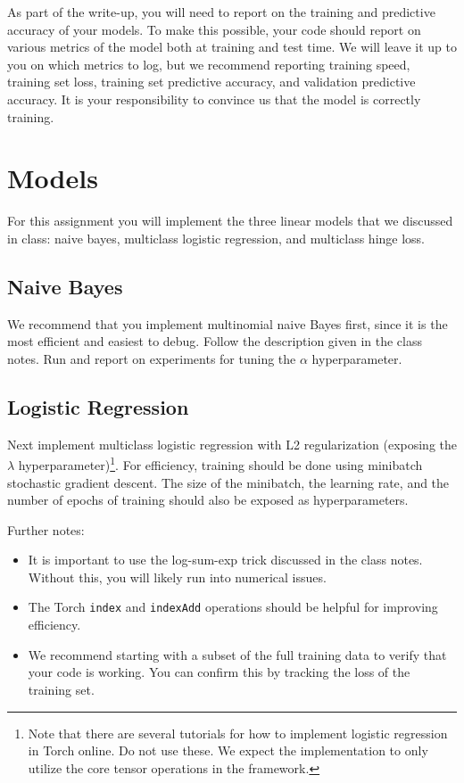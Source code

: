 \documentclass[11pt]{article}
\begin{document}
As part of the write-up, you will need to report on the training and
predictive accuracy of your models. To make this possible, your code
should report on various metrics of the model both at training and
test time. We will leave it up to you on which metrics to log, but we
recommend reporting training speed, training set loss, training set
predictive accuracy, and validation predictive accuracy. It is your
responsibility to convince us that the model is correctly training.

\section{Models}

For this assignment you will implement the three linear models that 
we discussed in class: naive bayes, multiclass logistic regression, 
and multiclass hinge loss.

\subsection{Naive Bayes}

We recommend that you implement multinomial naive Bayes first, since
it is the most efficient and easiest to debug. Follow the description
given in the class notes. Run and report on experiments for tuning the
$\alpha$ hyperparameter.

\subsection{Logistic Regression}

Next implement multiclass logistic regression with L2 regularization
(exposing the $\lambda$ hyperparameter)\footnote{Note that there are several tutorials for how to implement logistic
regression in Torch online. Do not use these. We expect the
implementation to only utilize the core tensor operations in the
framework.}. For efficiency, training
should be done using minibatch stochastic gradient descent. The size
of the minibatch, the learning rate, and the number of epochs of
training should also be exposed as hyperparameters.


Further notes:

\begin{itemize}
\item It is important to use the log-sum-exp trick discussed in the
  class notes. Without this, you will likely run into numerical
  issues.

\item The Torch \texttt{index} and \texttt{indexAdd} operations should 
  be helpful for improving efficiency.

\item We recommend starting with a subset of the full training data to
  verify that your code is working. You can confirm this by tracking
  the loss of the training set.
\end{itemize}
\end{document}

